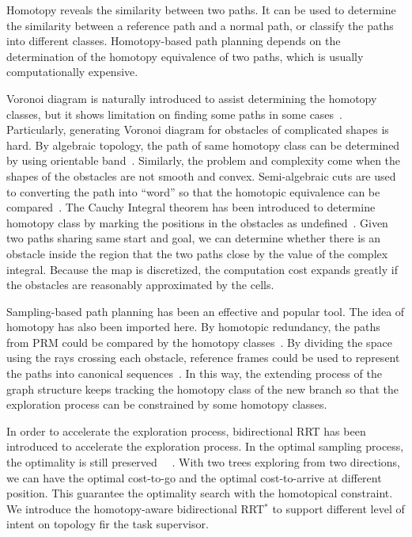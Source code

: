 \documentclass[letterpaper, 10 pt, conference]{ieeeconf}
\begin{document}
Homotopy reveals the similarity between two paths.
It can be used to determine the similarity between a reference path and a normal path, or classify the paths into different classes.
Homotopy-based path planning depends on the determination of the homotopy equivalence of two paths, which is usually computationally expensive.

Voronoi diagram is naturally introduced to assist determining the homotopy classes, but it shows limitation on finding some paths in some cases~\cite{banerjee2013framework}.
Particularly, generating Voronoi diagram for obstacles of complicated shapes is hard.
By algebraic topology, the path of same homotopy class can be determined by using orientable band~\cite{Hershberger199463}.
Similarly, the problem and complexity come when the shapes of the obstacles are not smooth and convex.
Semi-algebraic cuts are used to converting the path into ``word'' so that the homotopic equivalence can be compared~\cite{Grigoriev:1998:PAS:281508.281528}.
The Cauchy Integral theorem has been introduced to determine homotopy class by marking the positions in the obstacles as undefined~\cite{AAAI101920}.
Given two paths sharing same start and goal, we can determine whether there is an obstacle inside the region that the two paths close by the value of the complex integral.
Because the map is discretized, the computation cost expands greatly if the obstacles are reasonably approximated by the cells.

Sampling-based path planning has been an effective and popular tool.
The idea of homotopy has also been imported here.
By homotopic redundancy, the paths from PRM could be compared by the homotopy classes~\cite{1041613}.
By dividing the space using the rays crossing each obstacle, reference frames could be used to represent the paths into canonical sequences~\cite{Hernandez201544}.
In this way, the extending process of the graph structure keeps tracking the homotopy class of the new branch so that the exploration process can be constrained by some homotopy classes.

In order to accelerate the exploration process, bidirectional RRT has been introduced to accelerate the exploration process.
In the optimal sampling process, the optimality is still preserved~
\cite{Jordan.Perez.ea:CSAIL13}~\cite{starek2014bidirectional}.
With two trees exploring from two directions, we can have the optimal cost-to-go and the optimal cost-to-arrive at different position.
This guarantee the optimality search with the homotopical constraint.
We introduce the homotopy-aware bidirectional RRT$^{*}$ to support different level of intent on topology fir the task supervisor.
\end{document}
